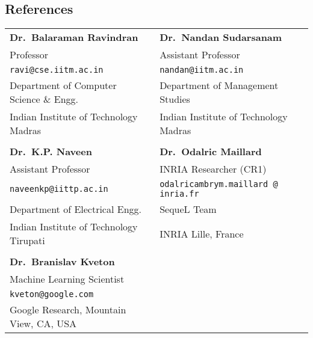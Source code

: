 \documentclass[margin,11pt]{res}
\begin{document}
\begin{resume}
\section{References}
\begin{tabular}{lll}
\textbf{Dr.~Balaraman Ravindran} & \textbf{Dr.~Nandan Sudarsanam} \\
Professor & Assistant Professor\\
\texttt{ravi@cse.iitm.ac.in} & \texttt{nandan@iitm.ac.in}\\
Department of Computer Science \& Engg. & Department of Management Studies\\ 
Indian Institute of Technology Madras & Indian Institute of Technology Madras\\
\\
\textbf{Dr.~K.P. Naveen}  & \textbf{Dr.~Odalric Maillard} \\
Assistant Professor & INRIA Researcher (CR1) \\
\texttt{naveenkp@iittp.ac.in} & \texttt{odalricambrym.maillard @ inria.fr}\\
Department of Electrical Engg. & SequeL Team \\ 
Indian Institute of Technology Tirupati & INRIA Lille, France\\
\\
\textbf{Dr.~Branislav Kveton}\\
Machine Learning Scientist\\
\texttt{kveton@google.com}\\
Google Research, Mountain View, CA, USA
\end{tabular}



\end{resume}
\end{document}
